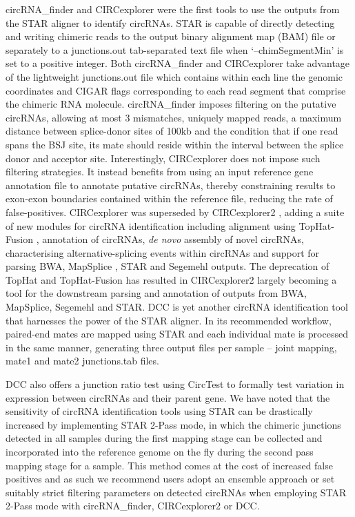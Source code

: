 circRNA\_finder and CIRCexplorer \cite{CIRCexplorer} were the first tools to use the outputs from the STAR aligner to identify circRNAs. STAR is capable of directly detecting and writing chimeric reads to the output binary alignment map (BAM) file or separately to a junctions.out tab-separated text file when `--chimSegmentMin' is set to a positive integer. Both circRNA\_finder and CIRCexplorer take advantage of the lightweight junctions.out file which contains within each line the genomic coordinates and CIGAR flags corresponding to each read segment that comprise the chimeric RNA molecule. circRNA\_finder imposes filtering on the putative circRNAs, allowing at most 3 mismatches, uniquely mapped reads, a maximum distance between splice-donor sites of 100kb and the condition that if one read spans the BSJ site, its mate should reside within the interval between the splice donor and acceptor site. Interestingly, CIRCexplorer does not impose such filtering strategies. It instead benefits from using an input reference gene annotation file to annotate putative circRNAs, thereby constraining results to exon-exon boundaries contained within the reference file, reducing the rate of false-positives. CIRCexplorer was superseded by CIRCexplorer2 \cite{CIRCexplorer2}, adding a suite of new modules for circRNA identification including alignment using TopHat-Fusion \cite{TopHatFusion}, annotation of circRNAs, \textit{de novo} assembly of novel circRNAs, characterising alternative-splicing events within circRNAs and support for parsing BWA, MapSplice \cite{MapSplice}, STAR and Segemehl \cite{segemehl} outputs. The deprecation of TopHat and TopHat-Fusion has resulted in CIRCexplorer2 largely becoming a tool for the downstream parsing and annotation of outputs from BWA, MapSplice, Segemehl and STAR. DCC \cite{DCC} is yet another circRNA identification tool that harnesses the power of the STAR aligner. In its recommended workflow, paired-end mates are mapped using STAR and each individual mate is processed in the same manner, generating three output files per sample -- joint mapping, mate1 and mate2 junctions.tab files. \par
DCC also offers a junction ratio test using CircTest to formally test variation in expression between circRNAs and their parent gene. We have noted that the sensitivity of circRNA identification tools using STAR can be drastically increased by implementing STAR 2-Pass mode, in which the chimeric junctions detected in all samples during the first mapping stage can be collected and incorporated into the reference genome on the fly during the second pass mapping stage for a sample. This method comes at the cost of increased false positives \cite{Engstrom2013Dec} and as such we recommend users adopt an ensemble approach or set suitably strict filtering parameters on detected circRNAs when employing STAR 2-Pass mode with circRNA\_finder, CIRCexplorer2 or DCC. \par
